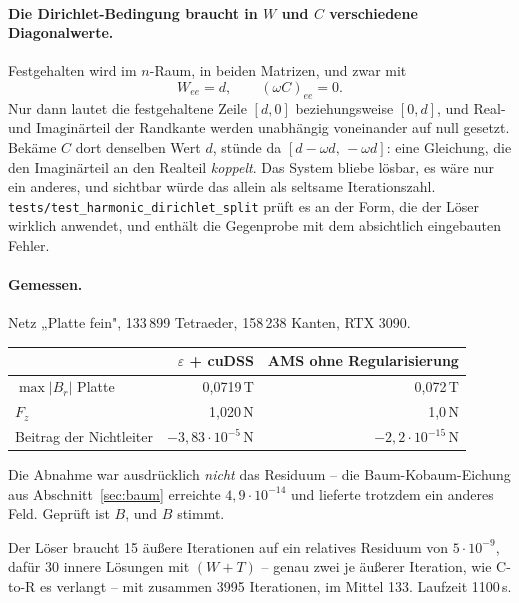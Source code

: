 \documentclass[11pt,a4paper]{article}
\begin{document}
\paragraph{Die Dirichlet-Bedingung braucht in $W$ und $C$ verschiedene
Diagonalwerte.} Festgehalten wird im $n$-Raum, in beiden Matrizen, und zwar mit
\begin{equation}
  W_{ee} = d, \qquad (\omega C)_{ee} = 0 .
\end{equation}
Nur dann lautet die festgehaltene Zeile $[d, 0]$ beziehungsweise $[0, d]$, und
Real- und Imaginärteil der Randkante werden unabhängig voneinander auf null
gesetzt. Bekäme $C$ dort denselben Wert $d$, stünde da $[d - \omega d,\,
-\omega d]$: eine Gleichung, die den Imaginärteil an den Realteil \emph{koppelt}.
Das System bliebe lösbar, es wäre nur ein anderes, und sichtbar würde das
allein als seltsame Iterationszahl.
\texttt{tests/test\_harmonic\_dirichlet\_split} prüft es an der Form, die der
Löser wirklich anwendet, und enthält die Gegenprobe mit dem absichtlich
eingebauten Fehler.

\paragraph{Gemessen.} Netz „Platte fein", 133\,899 Tetraeder,
158\,238 Kanten, RTX 3090.

\begin{center}
\begin{tabular}{lrr}
\toprule
 & $\varepsilon$ + cuDSS & AMS ohne Regularisierung \\
\midrule
$\max|B_r|$ Platte      & 0,0719\,T   & 0,072\,T \\
$F_z$                   & 1,020\,N    & 1,0\,N \\
Beitrag der Nichtleiter & $-3{,}83\cdot10^{-5}$\,N & $-2{,}2\cdot10^{-15}$\,N \\
\bottomrule
\end{tabular}
\end{center}

Die Abnahme war ausdrücklich \emph{nicht} das Residuum -- die
Baum-Kobaum-Eichung aus Abschnitt~\ref{sec:baum} erreichte
$4{,}9\cdot10^{-14}$ und lieferte trotzdem ein anderes Feld. Geprüft ist $B$,
und $B$ stimmt.

Der Löser braucht 15 äußere Iterationen auf ein relatives Residuum von
$5\cdot10^{-9}$, dafür 30 innere Lösungen mit $(W+T)$ -- genau zwei je äußerer
Iteration, wie C-to-R es verlangt -- mit zusammen 3995 Iterationen, im Mittel
133. Laufzeit 1100\,s.
\end{document}
